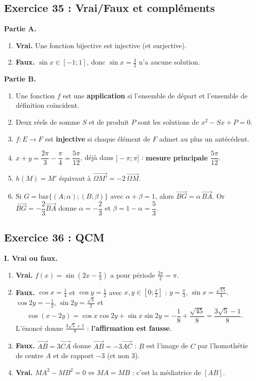 \documentclass[11pt,a4paper]{article}
\newcommand{\vect}[1]{\overrightarrow{#1}}
\begin{document}
\subsection{Exercice 35 : Vrai/Faux et compl\'ements}

\textbf{Partie A.}
\begin{enumerate}
  \item \textbf{Vrai.} Une fonction bijective est injective (et surjective).
  \item \textbf{Faux.} $\sin x\in[-1;1]$, donc $\sin x=\frac32$ n'a aucune solution.
\end{enumerate}

\textbf{Partie B.}
\begin{enumerate}
  \item Une fonction $f$ est une \textbf{application} si l'ensemble de d\'epart et l'ensemble de d\'efinition coïncident.
  \item Deux r\'eels de somme $S$ et de produit $P$ sont les solutions de $\boxed{x^2-Sx+P=0}$.
  \item $f:E\to F$ est \textbf{injective} si chaque \'el\'ement de $F$ admet au plus un ant\'ec\'edent.
  \item $x+y=\dfrac{2\pi}{3}-\dfrac{\pi}{4}=\dfrac{5\pi}{12}$, d\'ej\`a dans $]-\pi;\pi]$ : \textbf{mesure principale $\dfrac{5\pi}{12}$}.
  \item $h(M)=M'$ \'equivaut \`a $\boxed{\vect{\Omega M'}=-2\,\vect{\Omega M}}$.
  \item Si $G=\mathrm{bar}\{(A;\alpha);(B;\beta)\}$ avec $\alpha+\beta=1$, alors $\vect{BG}=\alpha\,\vect{BA}$.
  Or $\vect{BG}=-\dfrac23\vect{BA}$ donne $\alpha=-\dfrac23$ et $\beta=1-\alpha=\dfrac53$.
\end{enumerate}

\subsection{Exercice 36 : QCM}

\textbf{I. Vrai ou faux.}
\begin{enumerate}
  \item \textbf{Vrai.} $f(x)=\sin\left(2x-\frac{\pi}{3}\right)$ a pour p\'eriode $\frac{2\pi}{2}=\pi$.
  \item \textbf{Faux.} $\cos x=\frac14$ et $\cos y=\frac12$ avec $x,y\in\left[0;\frac{\pi}{2}\right]$ : $y=\frac{\pi}{3}$, $\sin x=\frac{\sqrt{15}}{4}$.
  $\cos2y=-\frac12$, $\sin2y=\frac{\sqrt3}{2}$ et
  \[
  \cos(x-2y)=\cos x\cos2y+\sin x\sin2y=-\frac18+\frac{\sqrt{45}}{8}=\frac{3\sqrt5-1}{8}.
  \]
  L'\'enonc\'e donne $\frac{3\sqrt5+1}{8}$ : \textbf{l'affirmation est fausse}.
  \item \textbf{Faux.} $\vect{AB}=3\vect{CA}$ donne $\vect{AB}=-3\vect{AC}$ : $B$ est l'image de $C$ par l'homoth\'etie de centre $A$ et de rapport $-3$ (et non $3$).
  \item \textbf{Vrai.} $MA^2-MB^2=0\iff MA=MB$ : c'est la m\'ediatrice de $[AB]$.
\end{enumerate}
\end{document}
